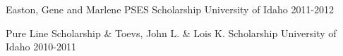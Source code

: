 

\begin{cvhonors}

  \cvhonor
    {} %
    {Easton, Gene and Marlene PSES Scholarship} %
    {University of Idaho} %
    {2011-2012} %

  \cvhonor
    {}
    {Pure Line Scholarship \& Toevs, John L. \& Lois K. Scholarship}
    {University of Idaho}
    {2010-2011}

\end{cvhonors}